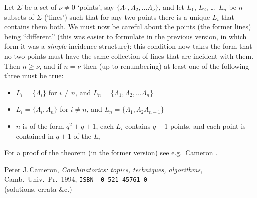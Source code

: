 \documentclass[12pt]{article}
\let\ge\geqslant
\def\bitem#1{\bibitem[#1]{#1}}
\def\name#1{{\sc #1}}
\def\book#1{{\sl #1\/}}
\def\isbn#1{{\small\tt ISBN\,\,#1}}
\begin{document}
%
Let $\Sigma$ be a set of $\nu\ne0$ `points', say $\{\Lambda_1,\Lambda_2,\dots
\Lambda_\nu\}$, and let $L_1$, $L_2$, \dots\ $L_n$ be $n$ subsets of $\Sigma$
(`lines') such that for any two points there is a unique $L_i$ that contains
them both. We must now be careful about the points (the former lines) being
``different'' (this was easier to formulate in the previous version, in which
form it was a {\em simple\/} incidence structure): this condition now takes the
form that no two points must have the same collection of lines that are
incident with them. Then $n\ge\nu$, and if $n=\nu$ then (up to renumbering)
at least one of the following three must be true:
%
\begin{itemize}

\item $L_i=\{\Lambda_i\}$ for $i\ne n$, and $L_n=\{\Lambda_1,\Lambda_2,\dots
\Lambda_n\}$

\item $L_i=\{\Lambda_i,\Lambda_n\}$ for $i\ne n$, and $L_n=\{\Lambda_1,\Lambda_2
\Lambda_{n-1}\}$

\item $n$ is of the form $q^2+q+1$, each $L_i$ contains $q+1$ points,
and each point is contained in $q+1$ of the $L_i$

\end{itemize}
%
For a proof of the theorem (in the former version) see e.g.\ Cameron \cite{Cam94}.

\clearpage
\raggedright
\begin{thebibliography}{MST73}

\bitem{Cam94} \name{Peter J.\,Cameron},
              \book{Combinatorics: topics, techniques, algorithms},\\
              Camb.~Univ.~Pr.~1994, \isbn{0\,521\,45761\,0}\\
{\tt{}}
              (solutions, errata \&c.)

\end{thebibliography}
\end{document}
